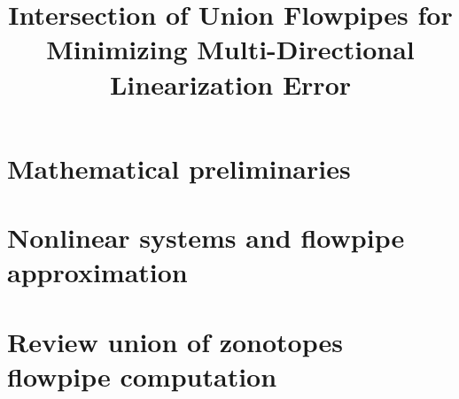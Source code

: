 


\title{Intersection of Union Flowpipes for Minimizing Multi-Directional Linearization Error}
\author{}
\institute{}
%

\maketitle

\section{Mathematical preliminaries}


\section{Nonlinear systems and flowpipe approximation}


\section{Review union of zonotopes flowpipe computation}






